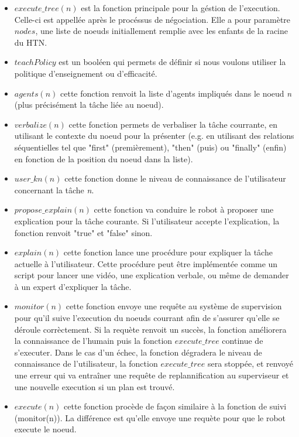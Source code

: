 \documentclass[a4paper,11pt,twoside]{StyleThese}
\begin{document}
\begin{itemize}
\item \textit{$execute\_tree(n)$} est la fonction principale pour la géstion de l'execution. Celle-ci est appellée après le procéssus de négociation. Elle a pour paramètre \textit{$nodes$}, une liste de noeuds initiallement remplie avec les enfants de la racine du HTN.
\item \textit{$teachPolicy$} est un booléen qui permets de définir si nous voulons utiliser la politique d'enseignement ou d'efficacité.
\item \textit{$agents(n)$} cette fonction renvoit la liste d'agents impliqués dans le noeud \textit{n} (plus précisément la tâche liée au noeud).
\item \textit{$verbalize(n)$} cette fonction permets de verbaliser la tâche courrante, en utilisant le contexte du noeud pour la présenter (e.g. en utilisant des relations séquentielles tel que "first" (premièrement), "then" (puis) ou "finally" (enfin) en fonction de la position du noeud dans la liste).
\item \textit{$user\_kn(n)$} cette fonction donne le niveau de connaissance de l'utilisateur concernant la tâche \textit{n}.
\item \textit{$propose\_explain(n)$} cette fonction va conduire le robot à proposer une explication pour la tâche courante. Si l'utilisateur accepte l'explication, la fonction renvoit "true" et "false" sinon.
\item \textit{$explain(n)$} cette fonction lance une procédure pour expliquer la tâche actuelle à l'utilisateur. Cette procédure peut être implémentée comme un script pour lancer une vidéo, une explication verbale, ou même de demander à un expert d'expliquer la tâche.
\item \textit{$monitor(n)$} cette fonction envoye une requête au système de supervision pour qu'il suive l'execution du noeuds courrant afin de s'assurer qu'elle se déroule corrèctement. Si la requète renvoit un succès, la fonction améliorera la connaissance de l'humain puis la fonction \textit{$execute\_tree$} continue de s'executer. Dans le cas d'un échec, la fonction dégradera le niveau de connaissance de l'utilisateur, la fonction \textit{$execute\_tree$} sera stoppée, et renvoyé une erreur qui va entraîner une requête de replannification au superviseur et une nouvelle execution si un plan est trouvé.
\item \textit{$execute(n)$} cette fonction procède de façon similaire à la fonction de suivi (monitor(n)). La différence est qu'elle envoye une requète pour que le robot execute le noeud.
\end{itemize}
 
\end{document}
